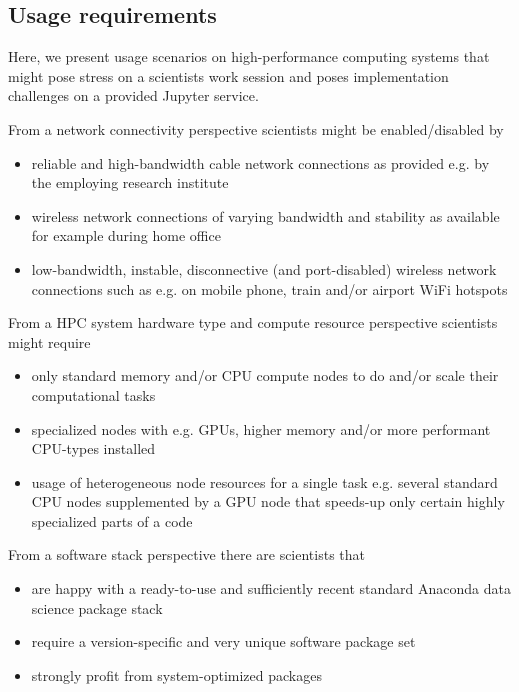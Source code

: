 \subsection{Usage requirements}

Here, we present usage scenarios on high-performance computing systems that might pose stress on a scientists work session and poses implementation challenges on a provided Jupyter service.

From a network connectivity perspective scientists might be enabled/disabled by

\begin{itemize}
  \item reliable and high-bandwidth cable network connections as provided e.g. by the employing research institute
  \item wireless network connections of varying bandwidth and stability as available for example during home office
  \item low-bandwidth, instable, disconnective (and port-disabled) wireless network connections such as e.g. on mobile phone, train and/or airport WiFi hotspots
\end{itemize}

From a HPC system hardware type and compute resource perspective scientists might require

\begin{itemize}
  \item only standard memory and/or CPU compute nodes to do and/or scale their computational tasks
  \item specialized nodes with e.g. GPUs, higher memory and/or more performant CPU-types installed
  \item usage of heterogeneous node resources for a single task e.g. several standard CPU nodes supplemented by a GPU node that speeds-up only certain highly specialized parts of a code
\end{itemize}

From a software stack perspective there are scientists that

\begin{itemize}
  \item are happy with a ready-to-use and sufficiently recent standard Anaconda data science package stack
  \item require a version-specific and very unique software package set
  \item strongly profit from system-optimized packages
\end{itemize}

